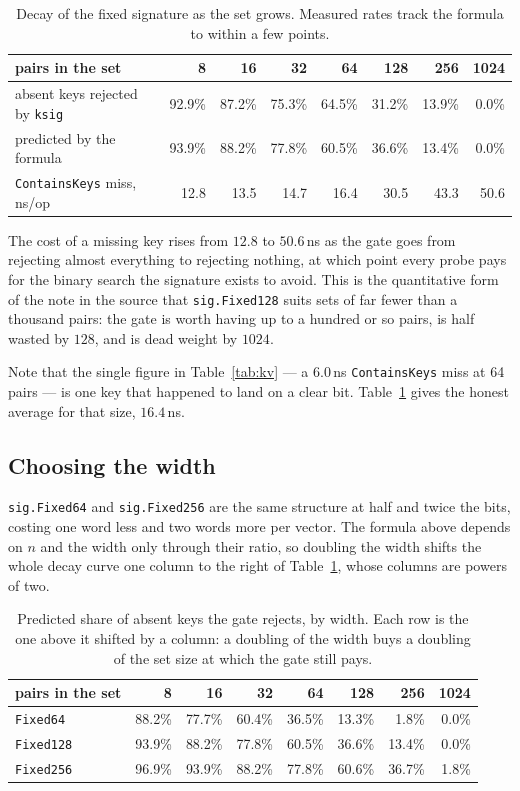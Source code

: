 \documentclass[11pt]{article}
\newcommand{\code}[1]{\texttt{#1}}
\begin{document}
\begin{table}[h]
\centering
\begin{tabular}{lrrrrrrr}
\hline
pairs in the set & 8 & 16 & 32 & 64 & 128 & 256 & 1024 \\
\hline
absent keys rejected by \code{ksig} & 92.9\% & 87.2\% & 75.3\% & 64.5\% & 31.2\% & 13.9\% & 0.0\% \\
predicted by the formula            & 93.9\% & 88.2\% & 77.8\% & 60.5\% & 36.6\% & 13.4\% & 0.0\% \\
\code{ContainsKeys} miss, ns/op     & 12.8 & 13.5 & 14.7 & 16.4 & 30.5 & 43.3 & 50.6 \\
\hline
\end{tabular}
\caption{Decay of the fixed signature as the set grows. Measured rates track the
formula to within a few points.}
\label{tab:sat}
\end{table}

The cost of a missing key rises from $12.8$ to $50.6$\,ns as the gate goes from
rejecting almost everything to rejecting nothing, at which point every probe
pays for the binary search the signature exists to avoid. This is the
quantitative form of the note in the source that \code{sig.Fixed128} suits sets
of far fewer than a thousand pairs: the gate is worth having up to a hundred or
so pairs, is half wasted by $128$, and is dead weight by $1024$.

Note that the single figure in Table~\ref{tab:kv} --- a $6.0$\,ns
\code{ContainsKeys} miss at 64 pairs --- is one key that happened to land on a
clear bit. Table~\ref{tab:sat} gives the honest average for that size, $16.4$\,ns.

\subsection{Choosing the width}

\code{sig.Fixed64} and \code{sig.Fixed256} are the same structure at half and
twice the bits, costing one word less and two words more per vector. The
formula above depends on $n$ and the width only through their ratio, so
doubling the width shifts the whole decay curve one column to the right of
Table~\ref{tab:sat}, whose columns are powers of two.

\begin{table}[h]
\centering
\begin{tabular}{lrrrrrrr}
\hline
pairs in the set & 8 & 16 & 32 & 64 & 128 & 256 & 1024 \\
\hline
\code{Fixed64}  & 88.2\% & 77.7\% & 60.4\% & 36.5\% & 13.3\% &  1.8\% & 0.0\% \\
\code{Fixed128} & 93.9\% & 88.2\% & 77.8\% & 60.5\% & 36.6\% & 13.4\% & 0.0\% \\
\code{Fixed256} & 96.9\% & 93.9\% & 88.2\% & 77.8\% & 60.6\% & 36.7\% & 1.8\% \\
\hline
\end{tabular}
\caption{Predicted share of absent keys the gate rejects, by width. Each row is
the one above it shifted by a column: a doubling of the width buys a doubling of
the set size at which the gate still pays.}
\label{tab:widths}
\end{table}
\end{document}
